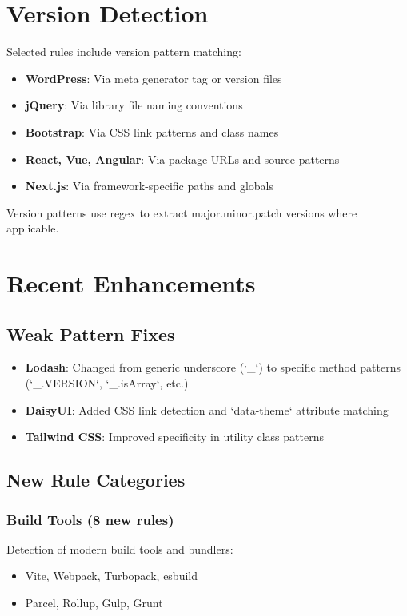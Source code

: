 \documentclass[11pt,a4paper,oneside]{article}
\begin{document}
\section{Version Detection}

Selected rules include version pattern matching:

\begin{itemize}
    \item \textbf{WordPress}: Via meta generator tag or version files
    \item \textbf{jQuery}: Via library file naming conventions
    \item \textbf{Bootstrap}: Via CSS link patterns and class names
    \item \textbf{React, Vue, Angular}: Via package URLs and source patterns
    \item \textbf{Next.js}: Via framework-specific paths and globals
\end{itemize}

Version patterns use regex to extract major.minor.patch versions where applicable.

\section{Recent Enhancements}

\subsection{Weak Pattern Fixes}
\begin{itemize}
    \item \textbf{Lodash}: Changed from generic underscore (`\_`) to specific method patterns (`_.VERSION`, `_.isArray`, etc.)
    \item \textbf{DaisyUI}: Added CSS link detection and `data-theme` attribute matching
    \item \textbf{Tailwind CSS}: Improved specificity in utility class patterns
\end{itemize}

\subsection{New Rule Categories}

\subsubsection{Build Tools (8 new rules)}
Detection of modern build tools and bundlers:
\begin{itemize}
    \item Vite, Webpack, Turbopack, esbuild
    \item Parcel, Rollup, Gulp, Grunt
\end{itemize}
\end{document}
